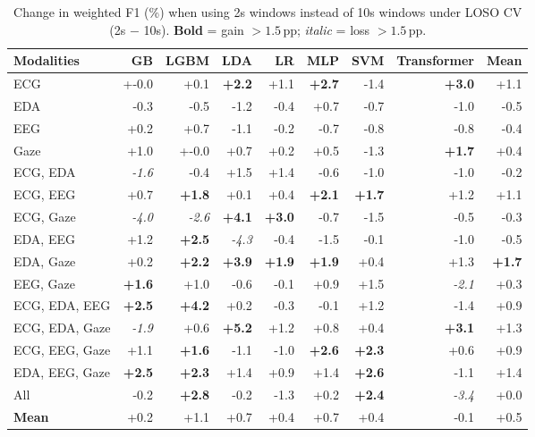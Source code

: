 \begin{table}[!htbp]
  \centering
  \scriptsize
  \setlength{\tabcolsep}{3pt}
  \caption{Change in weighted F1 (\%) when using 2s windows instead of 10s windows under LOSO CV (2s $-$ 10s). \textbf{Bold} = gain $>1.5$\,pp; \textit{italic} = loss $>1.5$\,pp.}
  \label{tab:delta_loso}
  \begin{tabular}{lrrrrrrrr}
    \toprule
    \textbf{Modalities} & GB & LGBM & LDA & LR & MLP & SVM & Transformer & \textbf{Mean} \\
    \midrule
    ECG & +-0.0 & +0.1 & \textbf{+2.2} & +1.1 & \textbf{+2.7} & -1.4 & \textbf{+3.0} & +1.1 \\
    EDA & -0.3 & -0.5 & -1.2 & -0.4 & +0.7 & -0.7 & -1.0 & -0.5 \\
    EEG & +0.2 & +0.7 & -1.1 & -0.2 & -0.7 & -0.8 & -0.8 & -0.4 \\
    Gaze & +1.0 & +-0.0 & +0.7 & +0.2 & +0.5 & -1.3 & \textbf{+1.7} & +0.4 \\
    \midrule
    ECG, EDA & \textit{-1.6} & -0.4 & +1.5 & +1.4 & -0.6 & -1.0 & -1.0 & -0.2 \\
    ECG, EEG & +0.7 & \textbf{+1.8} & +0.1 & +0.4 & \textbf{+2.1} & \textbf{+1.7} & +1.2 & +1.1 \\
    ECG, Gaze & \textit{-4.0} & \textit{-2.6} & \textbf{+4.1} & \textbf{+3.0} & -0.7 & -1.5 & -0.5 & -0.3 \\
    EDA, EEG & +1.2 & \textbf{+2.5} & \textit{-4.3} & -0.4 & -1.5 & -0.1 & -1.0 & -0.5 \\
    EDA, Gaze & +0.2 & \textbf{+2.2} & \textbf{+3.9} & \textbf{+1.9} & \textbf{+1.9} & +0.4 & +1.3 & \textbf{+1.7} \\
    EEG, Gaze & \textbf{+1.6} & +1.0 & -0.6 & -0.1 & +0.9 & +1.5 & \textit{-2.1} & +0.3 \\
    \midrule
    ECG, EDA, EEG & \textbf{+2.5} & \textbf{+4.2} & +0.2 & -0.3 & -0.1 & +1.2 & -1.4 & +0.9 \\
    ECG, EDA, Gaze & \textit{-1.9} & +0.6 & \textbf{+5.2} & +1.2 & +0.8 & +0.4 & \textbf{+3.1} & +1.3 \\
    ECG, EEG, Gaze & +1.1 & \textbf{+1.6} & -1.1 & -1.0 & \textbf{+2.6} & \textbf{+2.3} & +0.6 & +0.9 \\
    EDA, EEG, Gaze & \textbf{+2.5} & \textbf{+2.3} & +1.4 & +0.9 & +1.4 & \textbf{+2.6} & -1.1 & +1.4 \\
    \midrule
    All & -0.2 & \textbf{+2.8} & -0.2 & -1.3 & +0.2 & \textbf{+2.4} & \textit{-3.4} & +0.0 \\
    \midrule
    \textbf{Mean} & +0.2 & +1.1 & +0.7 & +0.4 & +0.7 & +0.4 & -0.1 & +0.5 \\
    \bottomrule
  \end{tabular}
\end{table}

